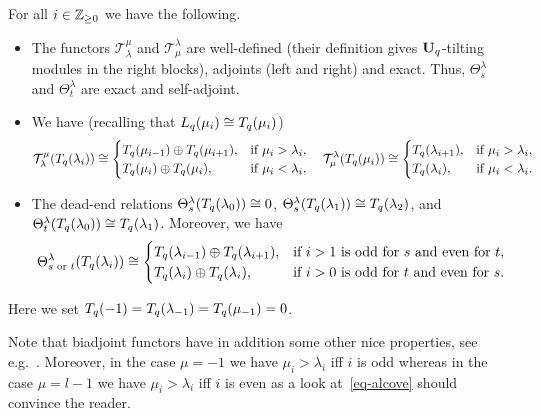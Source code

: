 \begin{prop}\label{prop-functors}
For all $i\in\mathbb{Z}_{\geq 0}$ we have 
the following.
\begin{itemize}
\item[(a)] The functors 
$\mathcal T_{\lambda}^{\mu}$ and $\mathcal T^{\lambda}_{\mu}$ are well-defined (their definition gives $\boldsymbol{\mathrm{U}}_q$-tilting modules in the right blocks), 
adjoints (left and right) and 
exact. Thus, $\Theta^{\lambda}_s$ and 
$\Theta^{\lambda}_t$ are exact and self-adjoint.
\item[(b)] We have (recalling that $L_q({\mu_i})\cong T_q({\mu_i})$)
\[
\mathcal T_{\lambda}^{\mu}(T_q({\lambda_i}))\cong\begin{cases}T_q({\mu_{i-1}})\oplus T_q({\mu_{i+1}}),  & \text{if }\mu_i>\lambda_i,\\
  T_q({\mu_i})\oplus T_q({\mu_i}),  & \text{if }\mu_i<\lambda_i,\end{cases}\quad
\mathcal T^{\lambda}_{\mu}(T_q({\mu_i}))\cong\begin{cases}T_q({\lambda_{i+1}}),  & \text{if }\mu_i>\lambda_i,\\
 T_q({\lambda_{i}}),  & \text{if }\mu_i<\lambda_i.\end{cases}
\]
\item[(c)] The dead-end relations $\Theta^{\lambda}_s(T_q({\lambda_0}))\cong0$, $\Theta^{\lambda}_s(T_q({\lambda_1}))\cong T_q({\lambda_2})$, and $\Theta^{\lambda}_t(T_q({\lambda_0}))\cong T_q({\lambda_1})$. Moreover, we have
\[
\Theta^{\lambda}_{s\text{ or }t}(T_q({\lambda_i}))\cong\begin{cases}T_q({\lambda_{i-1}})\oplus T_q({\lambda_{i+1}}) ,  & \text{if }i>1\text{ is odd for }s\text{ and even for }t,\\
  T_q({\lambda_{i}})\oplus T_q({\lambda_{i}}) ,  & \text{if }i>0\text{ is odd for }t\text{ and even for }s.\end{cases}
\]
\end{itemize}
Here we set $T_q({-1})=T_q({\lambda_{-1}})=T_q({\mu_{-1}})=0$.\makeqed
\end{prop}


Note that biadjoint functors have in 
addition some other nice properties, see e.g.~\cite[Section~2]{kh5}. Moreover, 
in the 
case $\mu=-1$ we have $\mu_i>\lambda_i$ 
iff $i$ is odd whereas in the case $\mu=l-1$ 
we have $\mu_i>\lambda_i$ iff $i$ is even as 
a look at~\eqref{eq-alcove} should convince the reader.



